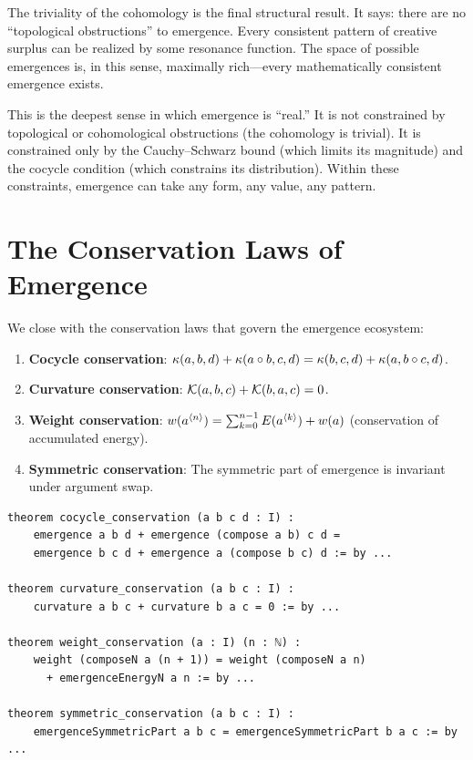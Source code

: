 \begin{interpretation}
The triviality of the cohomology is the final structural result. It says: there
are no ``topological obstructions'' to emergence. Every consistent pattern of
creative surplus can be realized by some resonance function. The space of possible
emergences is, in this sense, maximally rich---every mathematically consistent
emergence exists.

This is the deepest sense in which emergence is ``real.'' It is not constrained
by topological or cohomological obstructions (the cohomology is trivial). It
is constrained only by the Cauchy--Schwarz bound (which limits its magnitude)
and the cocycle condition (which constrains its distribution). Within these
constraints, emergence can take any form, any value, any pattern.
\end{interpretation}


\section{The Conservation Laws of Emergence}

We close with the conservation laws that govern the emergence ecosystem:

\begin{theorem}
\label{thm:conservation}
\begin{enumerate}
  \item \textbf{Cocycle conservation}: $\kappa(a,b,d) + \kappa(a \circ b, c, d)
    = \kappa(b,c,d) + \kappa(a, b \circ c, d)$.
  \item \textbf{Curvature conservation}: $\mathcal{K}(a,b,c) + \mathcal{K}(b,a,c) = 0$.
  \item \textbf{Weight conservation}: $w(a^{\langle n \rangle}) = \sum_{k=0}^{n-1}
    E(a^{\langle k \rangle}) + w(a)$ (conservation of accumulated energy).
  \item \textbf{Symmetric conservation}: The symmetric part of emergence is
    invariant under argument swap.
\end{enumerate}
\end{theorem}

\begin{lstlisting}[caption={Conservation laws (IDT\_v3\_Emergence.lean)}]
theorem cocycle_conservation (a b c d : I) :
    emergence a b d + emergence (compose a b) c d =
    emergence b c d + emergence a (compose b c) d := by ...

theorem curvature_conservation (a b c : I) :
    curvature a b c + curvature b a c = 0 := by ...

theorem weight_conservation (a : I) (n : ℕ) :
    weight (composeN a (n + 1)) = weight (composeN a n)
      + emergenceEnergyN a n := by ...

theorem symmetric_conservation (a b c : I) :
    emergenceSymmetricPart a b c = emergenceSymmetricPart b a c := by ...
\end{lstlisting}


